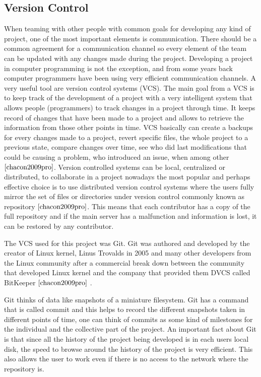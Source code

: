 \documentclass{book}
\begin{document}
\subsection{Version Control}
When teaming with other people with common goals for developing any kind of project, one of the most important elements is communication. There should be a common agreement for a communication channel so every element of the team can be updated with any changes made during the project. 
Developing a project in computer programming is not the exception, and from some years back computer programmers have been using very efficient communication channels. A very useful tool are version control systems (VCS). The main goal from a VCS is to keep track of the development of a project with a very intelligent system that allows people (programmers) to track changes in a project through time. It keeps record of changes that have been made to a project and allows to retrieve the information from those other points in time. VCS basically can create a backups for every changes made to a project, revert specific files, the whole project to a previous state, compare changes over time, see who did last modifications that could be causing a problem, who introduced an issue, when among other $\cite{chacon2009pro}$. Version controlled systems can be local, centralized or distributed, to collaborate in a project nowadays the most popular and perhaps effective choice is to use distributed version control systems where the users fully mirror the set of files or directories under version control commonly known as repository $\cite{chacon2009pro}$. This means that each contributor has a copy of the full repository and if the main server has a malfunction and information is lost, it can be restored by any contributor. 

The VCS used for this project was Git. Git was authored and developed by the creator of Linux kernel, Linus Trovalds in 2005 and many other developers from the Linux community after a commercial break down between the community that developed Linux kernel and the company that provided them DVCS called BitKeeper $\cite{chacon2009pro}$ . 

Git thinks of data like snapshots of a miniature filesystem. Git has a command that is called commit and this helps to record the different snapshots taken in different points of time, one can think of commits as some kind of milestones for the individual and the collective part of the project. An important fact about Git is that since all the history of the project being developed is in each users local disk, the speed to browse around the history of the project is very efficient. This also allows the user to work even if there is no access to the network where the repository is. 
\end{document}
